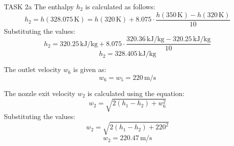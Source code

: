 TASK 2a  
The enthalpy \( h_2 \) is calculated as follows:  
\[
h_2 = h(328.075 \, \text{K}) = h(320 \, \text{K}) + 8.075 \cdot \frac{h(350 \, \text{K}) - h(320 \, \text{K})}{10}
\]  
Substituting the values:  
\[
h_2 = 320.25 \, \text{kJ/kg} + 8.075 \cdot \frac{320.36 \, \text{kJ/kg} - 320.25 \, \text{kJ/kg}}{10}
\]  
\[
h_2 = 328.405 \, \text{kJ/kg}
\]  

The outlet velocity \( w_6 \) is given as:  
\[
w_6 = w_5 = 220 \, \text{m/s}
\]  

The nozzle exit velocity \( w_2 \) is calculated using the equation:  
\[
w_2 = \sqrt{2(h_1 - h_2) + w_6^2}
\]  
Substituting the values:  
\[
w_2 = \sqrt{2(h_1 - h_2) + 220^2}
\]  
\[
w_2 = 220.47 \, \text{m/s}
\]